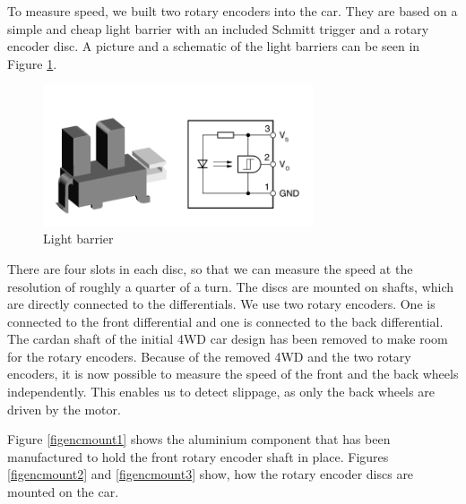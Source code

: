 \documentclass[a4paper
               ,10pt
               ,DIV=10 %
               ,BCOR=0.3cm
               ,pagesize %
               ,headings=small
               ,bibtotoc
               ]
               {scrartcl}
\begin{document}
To measure speed, we built two rotary encoders into the car.
They are based on a simple and cheap light barrier with an included Schmitt trigger and a rotary encoder disc.
A picture and a schematic of the light barriers can be seen in Figure \ref{figls}.
\begin{figure}[H]
\begin{center}
\includegraphics[width=8cm]{pic/ls.png}
\caption{Light barrier}
\end{center}
\label{figls}
\end{figure}

There are four slots in each disc, so that we can measure the speed at the resolution of roughly a quarter of a turn.
The discs are mounted on shafts, which are directly connected to the differentials.
We use two rotary encoders.
One is connected to the front differential and one is connected to the back differential.
The cardan shaft of the initial 4WD car design has been removed to make room for the rotary encoders.
Because of the removed 4WD and the two rotary encoders, it is now possible to measure the speed of the front and the back wheels independently.
This enables us to detect slippage, as only the back wheels are driven by the motor.

Figure \ref{figencmount1} shows the aluminium component that has been manufactured to hold the front rotary encoder shaft in place.
Figures \ref{figencmount2} and \ref{figencmount3} show, how the rotary encoder discs are mounted on the car.
\end{document}
